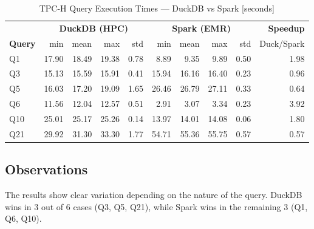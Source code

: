 \documentclass[12pt,a4paper]{article}
\begin{document}
\begin{table}[H]
  \centering
  \caption{TPC-H Query Execution Times --- DuckDB vs Spark [seconds]}
  \label{tab:results}
  \begin{tabular}{lrrrr|rrrr|r}
    \toprule
    & \multicolumn{4}{c|}{\textbf{DuckDB (HPC)}} & \multicolumn{4}{c|}{\textbf{Spark (EMR)}} & \textbf{Speedup} \\
    \textbf{Query} & min & mean & max & std & min & mean & max & std & Duck/Spark \\
    \midrule
    Q1  & 17.90 & 18.49 & 19.38 & 0.78 &  8.89 &  9.35 &  9.89 & 0.50 & 1.98 \\
    Q3  & 15.13 & 15.59 & 15.91 & 0.41 & 15.94 & 16.16 & 16.40 & 0.23 & 0.96 \\
    Q5  & 16.03 & 17.20 & 19.09 & 1.65 & 26.46 & 26.79 & 27.11 & 0.33 & 0.64 \\
    Q6  & 11.56 & 12.04 & 12.57 & 0.51 &  2.91 &  3.07 &  3.34 & 0.23 & 3.92 \\
    Q10 & 25.01 & 25.17 & 25.26 & 0.14 & 13.97 & 14.01 & 14.08 & 0.06 & 1.80 \\
    Q21 & 29.92 & 31.30 & 33.30 & 1.77 & 54.71 & 55.36 & 55.75 & 0.57 & 0.57 \\
    \bottomrule
  \end{tabular}
\end{table}

\subsection{Observations}

The results show clear variation depending on the nature of the query. DuckDB wins
in 3 out of 6 cases (Q3, Q5, Q21), while Spark wins in the remaining 3 (Q1, Q6, Q10).
\end{document}
